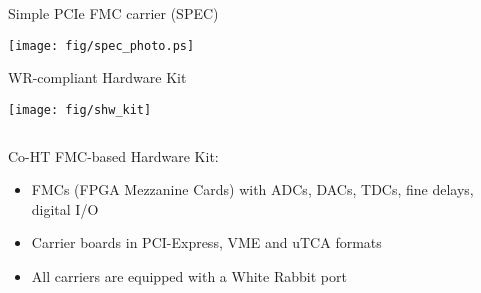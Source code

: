 \documentclass[compress,red]{beamer}
\begin{document}
\begin{frame}{Simple PCIe FMC carrier (SPEC)}

    \begin{center}
    \texttt{[image: fig/spec\_photo.ps]}
    \end{center}


\end{frame}
\begin{frame}{WR-compliant Hardware Kit}

    \begin{center}
    \texttt{[image: fig/shw\_kit]}
    \end{center}

  \begin{columns}[c]

	\begin{block}{Co-HT FMC-based Hardware Kit:}
	  \begin{itemize}
	  \item FMCs (FPGA Mezzanine Cards) with ADCs, DACs, TDCs, fine delays, digital I/O
	  \item Carrier boards in PCI-Express, VME and uTCA formats
	  \item All carriers are equipped with a White Rabbit port
	  \end{itemize}
	\end{block}

  \end{columns}


\end{frame}
\end{document}
